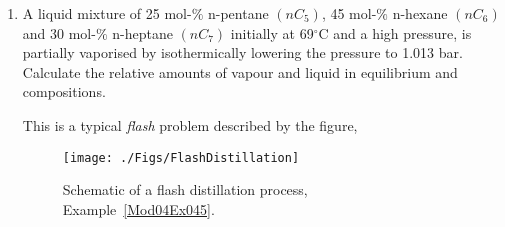 \begin{enumerate}[1)]
\clearpage
   \item\label{Mod04Ex045} A liquid mixture of 25 mol-$\%$ n-pentane $\left(nC_{5}\right)$, 45 mol-$\%$ n-hexane $\left(nC_{6}\right)$ and 30 mol-$\%$ n-heptane $\left(nC_{7}\right)$ initially at 69$^{\circ}$C and a high pressure, is partially vaporised by isothermically lowering the pressure to  1.013 bar. Calculate the relative amounts of vapour and liquid in equilibrium and compositions.

  This is a typical {\it flash} problem described by the figure,
    
  \begin{figure}[h]
     \begin{center}
         \texttt{[image: ./Figs/FlashDistillation]}
     \end{center}
     \caption{Schematic of a flash distillation process, Example~\ref{Mod04Ex045}.}
  \end{figure}


\end{enumerate}
